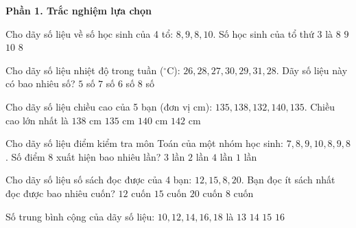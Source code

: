 \textbf{Phần 1. Trắc nghiệm lựa chọn}

\begin{ex} %
Cho dãy số liệu về số học sinh của 4 tổ: $8, 9, 8, 10$. Số học sinh của tổ thứ 3 là
\choice
{$8$}
{$9$}
{$10$}
{\True $8$}
\end{ex}

\begin{ex} %
Cho dãy số liệu nhiệt độ trong tuần ($^\circ\text{C}$): $26, 28, 27, 30, 29, 31, 28$. Dãy số liệu này có bao nhiêu số?
\choice
{$5$ số}
{\True $7$ số}
{$6$ số}
{$8$ số}
\end{ex}

\begin{ex} %
Cho dãy số liệu chiều cao của 5 bạn (đơn vị $\text{cm}$): $135, 138, 132, 140, 135$. Chiều cao lớn nhất là
\choice
{$138\text{ cm}$}
{$135\text{ cm}$}
{\True $140\text{ cm}$}
{$142\text{ cm}$}
\end{ex}

\begin{ex} %
Cho dãy số liệu điểm kiểm tra môn Toán của một nhóm học sinh: $7, 8, 9, 10, 8, 9, 8$. Số điểm 8 xuất hiện bao nhiêu lần?
\choice
{\True $3$ lần}
{$2$ lần}
{$4$ lần}
{$1$ lần}
\end{ex}

\begin{ex} %
Cho dãy số liệu số sách đọc được của 4 bạn: $12, 15, 8, 20$. Bạn đọc ít sách nhất đọc được bao nhiêu cuốn?
\choice
{$12$ cuốn}
{$15$ cuốn}
{$20$ cuốn}
{\True $8$ cuốn}
\end{ex}

\begin{ex} %
Số trung bình cộng của dãy số liệu: $10, 12, 14, 16, 18$ là
\choice
{$13$}
{\True $14$}
{$15$}
{$16$}
\end{ex}

